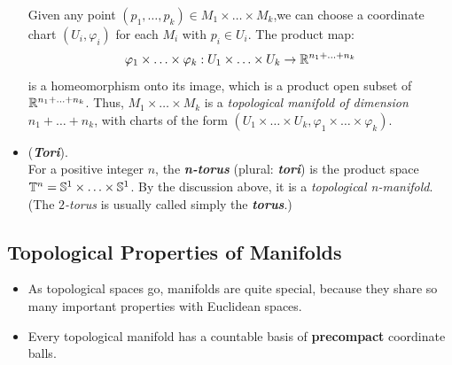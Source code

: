 \documentclass[11pt]{article}
\begin{document}
\begin{itemize}
\begin{example}
Given any point $(p_1, \ldots, p_k) \in  M_1 \times \ldots \times M_k$,we can choose a coordinate chart $(U_i, \varphi_i)$ for each $M_i$ with $p_i \in U_i$. The product map:
\begin{align*}
\varphi_1\times \ldots \times \varphi_{k}: U_1 \times \ldots \times U_k \rightarrow {\mathbb R}^{n_1 + \ldots + n_k}
\end{align*} is a homeomorphism onto its image, which is a product open subset of ${\mathbb R}^{n_1 + \ldots + n_k}$. Thus, $M_1 \times \ldots \times M_k$ is a \emph{topological manifold of dimension} $n_1 + \ldots + n_k$, with charts of the form $(U_1 \times \ldots \times U_k, \varphi_1\times \ldots \times \varphi_{k})$.
\end{example}

\item \begin{example} (\emph{\textbf{Tori}}).\\
 For a positive integer $n$, the \emph{\textbf{n-torus}} (plural: \emph{\textbf{tori}}) is the product space $\mathbb{T}^n = {\mathbb S}^1 \times \ldots \times {\mathbb S}^1$. By the discussion above, it is a \emph{topological n-manifold}. (The \emph{$2$-torus} is usually called simply the \emph{\textbf{torus}}.)
 \end{example}
\end{itemize}

\subsection{Topological Properties of Manifolds}
\begin{itemize}
\item As topological spaces go, manifolds are quite special, because they share so many important properties with Euclidean spaces. 

\item \begin{lemma}
Every topological manifold has a countable basis of \textbf{precompact} coordinate balls.
\end{lemma}
\end{itemize}
\end{document}
